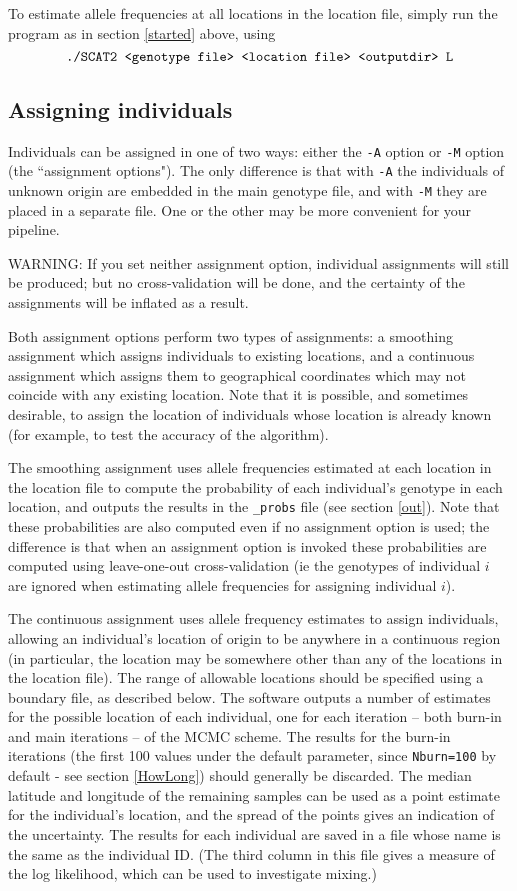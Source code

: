 \documentclass[10pt,titlepage,times,letterpaper]{article}
\begin{document}
To estimate allele frequencies at all locations in the location
file, simply run the program as in section \ref{started} above,
using
$$\text{{\tt ./SCAT2 <genotype file> <location file> <outputdir> L}}$$

\subsection{Assigning individuals}  \label{assign}

Individuals can be assigned in one of two ways: either the {\tt -A} option or 
{\tt -M} option (the ``assignment options").  The only difference 
is that with {\tt -A} the individuals of unknown origin are embedded in the 
main genotype file, and with {\tt -M} they are placed in a
separate file.  One or the other may be more convenient for your pipeline.

WARNING:  If you set neither assignment option, individual assignments
will still be produced; but no cross-validation will be done, and the certainty of
the assignments will be inflated as a result.

Both assignment options perform two types of assignments: a smoothing assignment 
which assigns individuals to existing locations, and a continuous assignment which
assigns them to geographical coordinates which may not coincide with any
existing location.  Note that it is
possible, and sometimes desirable, to assign the location of individuals
whose location is already known (for example, to test the accuracy of the
algorithm).  

The smoothing assignment uses allele frequencies estimated at each
location in the location file to compute the probability of each
individual's genotype in each location, and outputs the results in the
{\tt \_probs} file (see section \ref{out}). Note that these
probabilities are also computed even if no assignment option is
used; the difference is that when an assignment option is invoked these
probabilities are computed using leave-one-out cross-validation (ie
the genotypes of individual $i$ are ignored when estimating allele
frequencies for assigning individual $i$).

The continuous assignment uses allele frequency estimates to assign
individuals, allowing an individual's location of origin to be
anywhere in a continuous region (in particular, the location may
be somewhere other than any of the locations in the location
file). The range of allowable locations should be specified using a
boundary file, as described below. The software outputs a number of
estimates for the possible location of each individual, one for each
iteration -- both burn-in and main iterations -- of the MCMC
scheme. The results for the burn-in iterations (the first 100 values
under the default parameter, since {\tt Nburn=100} by default - see section
\ref{HowLong}) should generally be discarded. The median latitude and
longitude of the remaining samples can be used as a point estimate for
the individual's location, and the spread of the points gives an
indication of the uncertainty. The results for each individual are saved 
in a file whose name is the same as the individual ID. (The third column in
this file gives a measure of the log likelihood, which can be
used to investigate mixing.)
\end{document}
